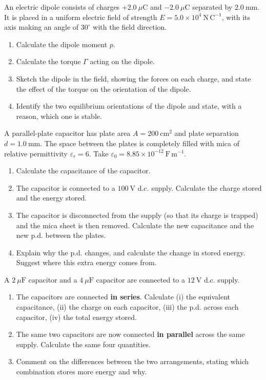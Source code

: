 \documentclass[11pt]{article}
\newcounter{popsec}
\newcounter{popsub}
\newcommand{\courssub}[1]{%
  \stepcounter{popsub}%
  \par\vspace{9pt}\noindent{\popxbold\fontsize{11.5}{13}\selectfont\color{popink}{\color{poporange}\thepopsec.\thepopsub}\hspace{6pt}#1}\par\nopagebreak\vspace{4pt}
}
\begin{document}
\courssub{I practise}

\begin{exercice}
An electric dipole consists of charges $+2.0\ \mu\mathrm{C}$ and $-2.0\ \mu\mathrm{C}$ separated by $2.0\ \mathrm{mm}$. It is placed in a uniform electric field of strength $E = 5.0\times10^{4}\ \mathrm{N\,C^{-1}}$, with its axis making an angle of $30^{\circ}$ with the field direction.
\begin{enumerate}
\item Calculate the dipole moment $p$.
\item Calculate the torque $\Gamma$ acting on the dipole.
\item Sketch the dipole in the field, showing the forces on each charge, and state the effect of the torque on the orientation of the dipole.
\item Identify the two equilibrium orientations of the dipole and state, with a reason, which one is stable.
\end{enumerate}
\end{exercice}

\begin{exercice}
A parallel-plate capacitor has plate area $A = 200\ \mathrm{cm^2}$ and plate separation $d = 1.0\ \mathrm{mm}$. The space between the plates is completely filled with mica of relative permittivity $\varepsilon_r = 6$. Take $\varepsilon_0 = 8.85\times10^{-12}\ \mathrm{F\,m^{-1}}$.
\begin{enumerate}
\item Calculate the capacitance of the capacitor.
\item The capacitor is connected to a $100\ \mathrm{V}$ d.c. supply. Calculate the charge stored and the energy stored.
\item The capacitor is disconnected from the supply (so that its charge is trapped) and the mica sheet is then removed. Calculate the new capacitance and the new p.d. between the plates.
\item Explain why the p.d. changes, and calculate the change in stored energy. Suggest where this extra energy comes from.
\end{enumerate}
\end{exercice}

\begin{exercice}
A $2\ \mu\mathrm{F}$ capacitor and a $4\ \mu\mathrm{F}$ capacitor are connected to a $12\ \mathrm{V}$ d.c. supply.
\begin{enumerate}
\item The capacitors are connected \textbf{in series}. Calculate (i) the equivalent capacitance, (ii) the charge on each capacitor, (iii) the p.d. across each capacitor, (iv) the total energy stored.
\item The same two capacitors are now connected \textbf{in parallel} across the same supply. Calculate the same four quantities.
\item Comment on the differences between the two arrangements, stating which combination stores more energy and why.
\end{enumerate}
\end{exercice}
\end{document}
